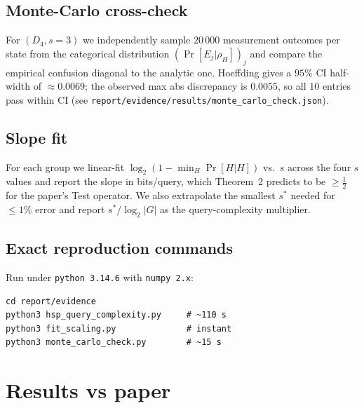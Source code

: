 \documentclass[11pt]{article}
\begin{document}
\subsection{Monte-Carlo cross-check}
For $(D_4, s{=}3)$ we independently sample $20\,000$ measurement outcomes
per state from the categorical distribution $(\Pr[E_j|\rho_H])_j$ and compare
the empirical confusion diagonal to the analytic one.  Hoeffding gives a
$95\%$ CI half-width of $\approx 0.0069$; the observed max abs discrepancy
is $0.0055$, so all $10$ entries pass within CI (see
\texttt{report/evidence/results/monte\_carlo\_check.json}).

\subsection{Slope fit}
For each group we linear-fit $\log_2(1-\min_H\Pr[H|H])$ vs.\ $s$
across the four $s$ values and report the slope in bits/query, which
Theorem~2 predicts to be $\ge \tfrac12$ for the paper's \textsf{Test}
operator.  We also extrapolate the smallest $s^*$ needed for $\le 1\%$
error and report $s^*/\log_2|G|$ as the query-complexity multiplier.

\subsection{Exact reproduction commands}
Run under \texttt{python 3.14.6} with \texttt{numpy 2.x}:
\begin{lstlisting}[basicstyle=\ttfamily\small]
cd report/evidence
python3 hsp_query_complexity.py     # ~110 s
python3 fit_scaling.py              # instant
python3 monte_carlo_check.py        # ~15 s
\end{lstlisting}

\section{Results vs paper}
\end{document}
